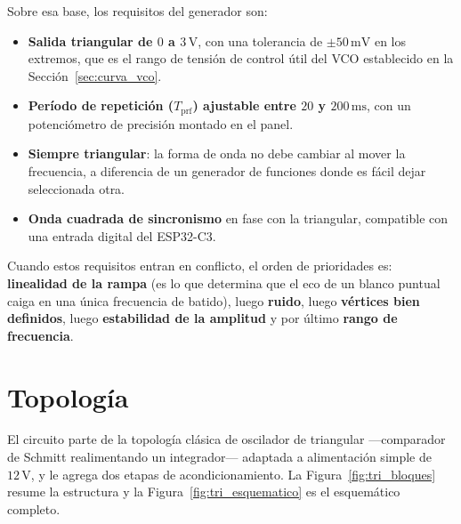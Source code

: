 \documentclass[12pt, a4paper, twoside]{report}
\begin{document}
Sobre esa base, los requisitos del generador son:

\begin{itemize}
  \item \textbf{Salida triangular de $0$ a $3\,\text{V}$}, con una
    tolerancia de $\pm 50\,\text{mV}$ en los extremos, que es el rango de
    tensión de control útil del VCO establecido en la
    Sección~\ref{sec:curva_vco}.
  \item \textbf{Período de repetición ($T_\text{prf}$) ajustable entre
    $20$ y $200\,\text{ms}$}, con un potenciómetro de precisión montado en
    el panel.
  \item \textbf{Siempre triangular}: la forma de onda no debe cambiar al
    mover la frecuencia, a diferencia de un generador de funciones donde
    es fácil dejar seleccionada otra.
  \item \textbf{Onda cuadrada de sincronismo} en fase con la triangular,
    compatible con una entrada digital del ESP32-C3.
\end{itemize}

Cuando estos requisitos entran en conflicto, el orden de prioridades es:
\textbf{linealidad de la rampa} (es lo que determina que el eco de un blanco
puntual caiga en una única frecuencia de batido), luego \textbf{ruido},
luego \textbf{vértices bien definidos}, luego \textbf{estabilidad de la
amplitud} y por último \textbf{rango de frecuencia}.

\section{Topología}
\label{sec:tri_topologia}

El circuito parte de la topología clásica de oscilador de triangular
---comparador de Schmitt realimentando un integrador--- adaptada a
alimentación simple de $12\,\text{V}$, y le agrega dos etapas de
acondicionamiento. La Figura~\ref{fig:tri_bloques} resume la estructura y la
Figura~\ref{fig:tri_esquematico} es el esquemático completo.
\end{document}
